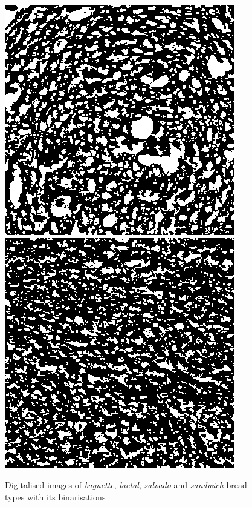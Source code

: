 \documentclass[oneside,a4paper,english,links]{amca}
\begin{document}
\begin{figure}[htb]
\includegraphics[scale=0.333]{imagenes/salvado43bin}
\includegraphics[scale=0.333]{imagenes/sandwich43bin}
\caption{Digitalised images of {\em baguette}, {\em lactal}, {\em salvado} and {\em sandwich} bread types with its binarisations}
\label{fig:bread}
\end{figure}
\end{document}
